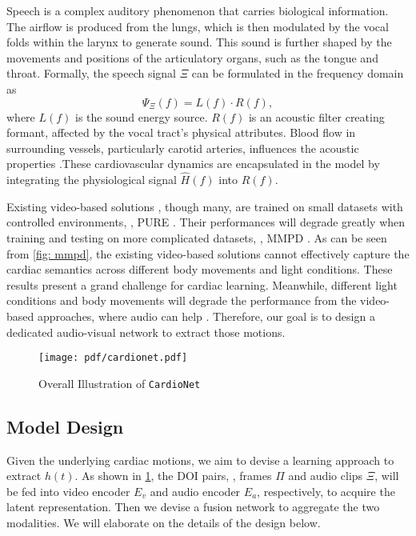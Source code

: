 Speech is a complex auditory phenomenon that carries biological information. The airflow is produced from the lungs, which is then modulated by the vocal folds within the larynx to generate sound. This sound is further shaped by the movements and positions of the articulatory organs, such as the tongue and throat. Formally, the speech signal $\Xi$ can be formulated in the frequency domain as 
\begin{equation}
\label{eq: audio_principle}
    \Psi_{\Xi}(f) = L(f) \cdot R(f),
\end{equation}
where $L(f)$ is the sound energy source. $R(f)$ is an acoustic filter creating formant, affected by the vocal tract's physical attributes. Blood flow in surrounding vessels, particularly carotid arteries, influences the acoustic properties \cite{xu2022hearing}.These cardiovascular dynamics are encapsulated in the model by integrating the physiological signal $\hat{H}(f)$ into $R(f)$. 

Existing video-based solutions \cite{liu2020multi, chen2018deepphys, yu2019remote, liu2023efficientphys, zou2024rhythmformer, wang2016algorithmic}, though many, are trained on small datasets with controlled environments, \eg, PURE \cite{stricker2014non}. Their performances will degrade greatly when training and testing on more complicated datasets, \eg, MMPD \cite{10340857}. As can be seen from  \fig\ref{fig: mmpd}, the existing video-based solutions cannot effectively capture the cardiac semantics across different body movements and light conditions. These results present a grand challenge for cardiac learning. Meanwhile, different light conditions and body movements will degrade the performance from the video-based approaches, where audio can help \cite{xu2022hearing}. Therefore, our goal is to design a dedicated audio-visual network to extract those motions. 

\begin{figure}[t]
    \centering
    \texttt{[image: pdf/cardionet.pdf]}
    \caption{Overall Illustration of \texttt{CardioNet}}
    \label{fig:overall_cardionet}
\end{figure}

\subsection{Model Design}
Given the underlying cardiac motions, we aim to devise a learning approach to extract $h(t)$. 
As shown in \fig\ref{fig:overall_cardionet}, the DOI pairs, \ie, frames $\Pi$ and audio clips $\Xi$, will be fed into video encoder $E_v$ and audio encoder $E_a$, respectively, to acquire the latent representation. Then we devise a fusion network to aggregate the two modalities. 
We will elaborate on the details of the design below.  



